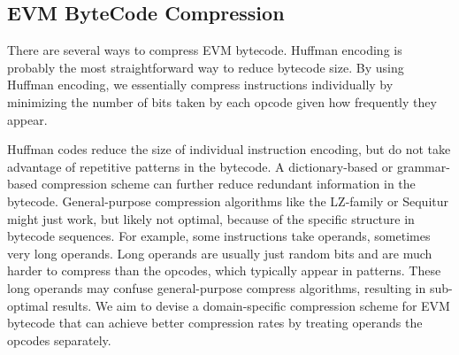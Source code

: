 
\subsection{EVM ByteCode Compression}\label{sec:evmcompress}

There are several ways to compress EVM bytecode. Huffman encoding is probably the most straightforward
way to reduce bytecode size. By using Huffman encoding, we essentially compress instructions individually
by minimizing the number of bits taken by each opcode given how frequently they appear.


Huffman codes reduce the size of individual instruction encoding, but do not take advantage of repetitive patterns in the bytecode.
A dictionary-based or grammar-based compression scheme can further reduce redundant information in the bytecode.
General-purpose compression algorithms like the LZ-family or Sequitur might just work,
but likely not optimal, because of the specific structure in bytecode sequences.
For example, some instructions take operands, sometimes very long operands.
Long operands are usually just random bits and are much harder to compress than the opcodes, which typically appear in patterns.
These long operands may confuse general-purpose compress algorithms, resulting in sub-optimal results.
We aim to devise a domain-specific compression scheme for EVM bytecode that can achieve better compression rates
by treating operands the opcodes separately.
